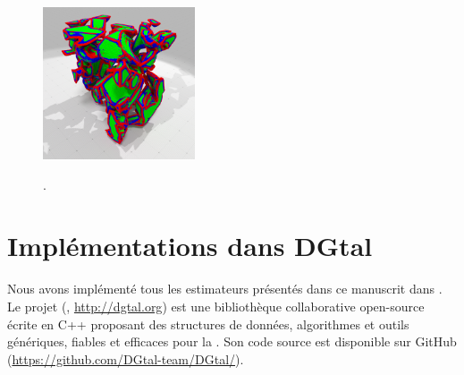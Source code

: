 \begin{figure}[ht]
{\begin{center}
    \includegraphics[width=4.5cm]{images/digitalSnow/Snow_E2bis_II_scale}\\
    \end{center}}
    \caption{.
      \label{fig:digitalSnow-curv}}
\end{figure}



%
%
%
%
%
%
%
%
%
%
%
%



\section{Implémentations dans DGtal}%
\label{sec:applications:dgtal}
%
Nous avons implémenté tous les estimateurs présentés dans ce manuscrit dans
\DGtal. Le projet \DGtal (,
\url{http://dgtal.org}) est une bibliothèque collaborative open-source écrite en
\textsc{C++} proposant des structures de données, algorithmes et outils
génériques, fiables et efficaces pour la \DigitalGeometry. Son code source est
disponible sur GitHub (\url{https://github.com/DGtal-team/DGtal/}).

